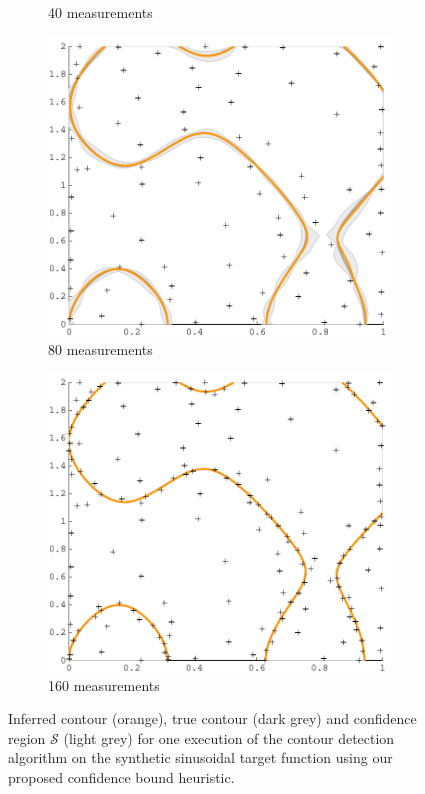 \documentclass[11pt]{article} %
\begin{document}
\begin{figure}[tb]
\begin{subfigure}[b]{0.5\textwidth}
    \caption{40 measurements}
  \end{subfigure}
  \begin{subfigure}[b]{0.5\textwidth}
    \centering
    \includegraphics[width=\textwidth]{figures/sin2d_80}
    \caption{80 measurements}
  \end{subfigure}
  \hfill
  \begin{subfigure}[b]{0.5\textwidth}
    \centering
    \includegraphics[width=\textwidth]{figures/sin2d_160}
    \caption{160 measurements}
  \end{subfigure}
  \caption{Inferred contour (orange), true contour (dark grey) and confidence
           region $\mathcal{S}$ (light grey) for one execution of the
           contour detection algorithm on the synthetic sinusoidal target
           function using our proposed confidence bound heuristic.}
  \label{fig:sin2d_steps}
\end{figure}
\end{document}
